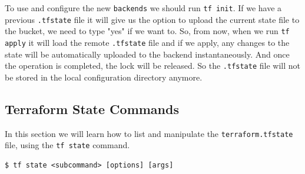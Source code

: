 \documentclass{article}
\newenvironment{codetemplate}[1][]{%
  \mybasecolorbox[#1]
  \itshape
}{%
  \endmybasecolorbox
}
\begin{document}
To use and configure the new \verb|backends| we should run \verb|tf init|. If we have a previous \verb|.tfstate| file it will give us the option to upload the current state file to the bucket, we need to type "yes" if we want to. So, from now, when we run \verb|tf apply| it will load the remote \verb|.tfstate| file and if we apply, any changes to the state will be automatically uploaded to the backend instantaneously. And once the operation is completed, the lock will be released. So the \verb|.tfstate| file will not be stored in the local configuration directory anymore. 

\subsection{Terraform State Commands}
In this section we will learn how to list and manipulate the \verb|terraform.tfstate| file, using the \verb|tf state| command.

\begin{codetemplate}{}
\begin{verbatim}
$ tf state <subcommand> [options] [args]
\end{verbatim}
\end{codetemplate}
\end{document}
